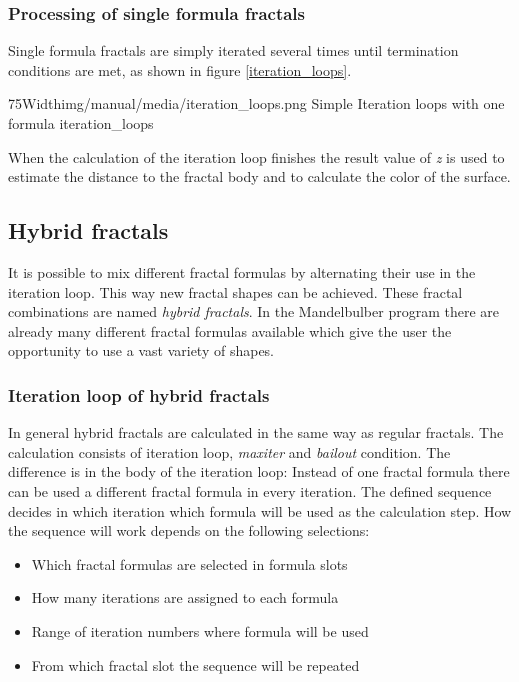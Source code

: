 \subsubsection{Processing of single formula fractals}

Single formula fractals are simply iterated several times until termination conditions are met, as shown in figure \ref{iteration_loops}. \nolinebreak \nopagebreak


\simpleImageWithCaption75Width{img/manual/media/iteration_loops.png}
{Simple Iteration loops with one formula}
{iteration_loops}

When the calculation of the iteration loop finishes the result value of \emph{z} is
used to estimate the distance to the fractal body and to calculate the color of the surface.

\subsection{Hybrid fractals}

It is possible to mix different fractal formulas by alternating their use in the iteration loop.
This way new fractal shapes can be achieved. These fractal combinations are named \emph{hybrid fractals}. 
In the Mandelbulber program there are already many different fractal formulas available which give the user 
the opportunity to use a vast variety of shapes.

\subsubsection{Iteration loop of hybrid fractals}

In general hybrid fractals are calculated in the same way as regular fractals.
The calculation consists of iteration loop, \emph{maxiter} and \emph{bailout} condition. The
difference is in the body of the iteration loop: Instead of one fractal formula there
can be used a different fractal formula in every iteration. The defined
sequence decides in which iteration which formula will be used as the calculation step.
How the sequence will work depends on the following selections:
\begin{itemize}
	\item Which fractal formulas are selected in formula slots
	\item How many iterations are assigned to each formula
	\item Range of iteration numbers where formula will be used
	\item From which fractal slot the sequence will be repeated
\end{itemize}

